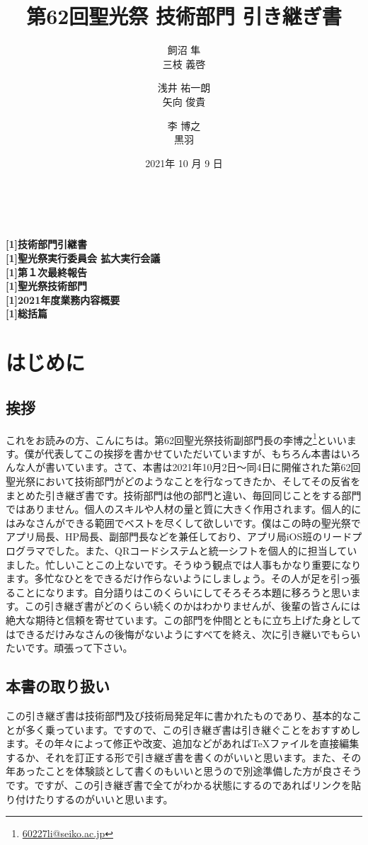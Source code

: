 \documentclass[dvipdfmx,jb5]{jarticle}
\title{第62回聖光祭 技術部門 引き継ぎ書}
\author{飼沼 隼 \\ 三枝 義啓 \and 浅井 祐一朗 \\ 矢向 俊貴 \and 李 博之 \\ 黒羽 }
\date{2021年 10 月 9 日}
\begin{document}
\begin{center}

\textbf {
\vspace{8.5cm}
\\
\\
\fontsize{50pt}{60pt}\selectfont \scalebox{1.05}[1]{技術部門引継書}\\
\fontsize{12pt}{30pt}\selectfont \scalebox{1.05}[1]{聖光祭実行委員会 拡大実行会議}\\
\fontsize{35pt}{35pt}\selectfont \scalebox{1.05}[1]{第１次最終報告}\\
\fontsize{12pt}{25pt}\selectfont \scalebox{1.05}[1]{聖光祭技術部門}\\
\fontsize{12pt}{15pt}\selectfont \scalebox{1.05}[1]{2021年度業務内容概要}\\
\fontsize{12pt}{20pt}\selectfont \scalebox{1.05}[1]{総括篇}\\
}
\end{center}
\pagebreak
\tableofcontents
\clearpage
\section{はじめに}
\subsection{挨拶}
これをお読みの方、こんにちは。第62回聖光祭技術副部門長の李博之\footnote{\url{60227li@seiko.ac.jp}}といいます。僕が代表してこの挨拶を書かせていただいていますが、もちろん本書はいろんな人が書いています。さて、本書は2021年10月2日〜同4日に開催された第62回聖光祭において技術部門がどのようなことを行なってきたか、そしてその反省をまとめた引き継ぎ書です。技術部門は他の部門と違い、毎回同じことをする部門ではありません。個人のスキルや人材の量と質に大きく作用されます。個人的にはみなさんができる範囲でベストを尽くして欲しいです。僕はこの時の聖光祭でアプリ局長、HP局長、副部門長などを兼任しており、アプリ局iOS班のリードプログラマでした。また、QRコードシステムと統一シフトを個人的に担当していました。忙しいことこの上ないです。そうゆう観点では人事もかなり重要になります。多忙なひとをできるだけ作らないようにしましょう。その人が足を引っ張ることになります。自分語りはこのくらいにしてそろそろ本題に移ろうと思います。この引き継ぎ書がどのくらい続くのかはわかりませんが、後輩の皆さんには絶大な期待と信頼を寄せています。この部門を仲間とともに立ち上げた身としてはできるだけみなさんの後悔がないようにすべてを終え、次に引き継いでもらいたいです。頑張って下さい。
\subsection{本書の取り扱い}
この引き継ぎ書は技術部門及び技術局発足年に書かれたものであり、基本的なことが多く乗っています。ですので、この引き継ぎ書は引き継ぐことをおすすめします。その年々によって修正や改変、追加などがあれば\TeX ファイルを直接編集するか、それを訂正する形で引き継ぎ書を書くのがいいと思います。また、その年あったことを体験談として書くのもいいと思うので別途準備した方が良さそうです。ですが、この引き継ぎ書で全てがわかる状態にするのであればリンクを貼り付けたりするのがいいと思います。
\end{document}
